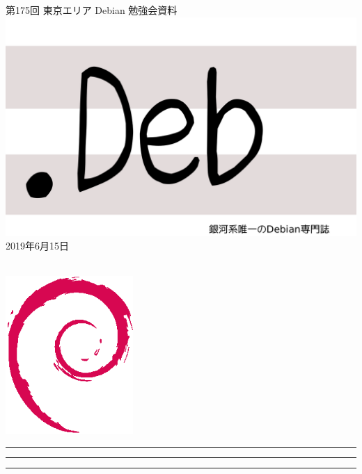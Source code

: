 \documentclass[mingoth,a4paper]{jsarticle}
\newcommand{\debmtgyear}{2019}
\newcommand{\debmtgmonth}{6}
\newcommand{\debmtgdate}{15}
\newcommand{\debmtgnumber}{175}
\begin{document}
\begin{titlepage}
\thispagestyle{empty}

\vspace*{-2cm}
第\debmtgnumber{}回 東京エリア Debian 勉強会資料\\
\hspace*{-2cm}
\includegraphics{image2012-natsu/dotdeb.pdf}\\
\hfill{}\debmtgyear{}年\debmtgmonth{}月\debmtgdate{}日

\\

\vspace*{-2cm}
\hfill{}\includegraphics[height=6cm]{image200502/openlogo-nd.eps}
\end{titlepage}

\newpage

\begin{minipage}[b]{0.2\hsize}
 \colorbox{titleback}{}
\end{minipage}
\begin{minipage}[b]{0.8\hsize}
\hrule
\vspace{2mm}
\hrule
\begin{multicols}{2}
\tableofcontents
\end{multicols}
\vspace{2mm}
\hrule
\end{minipage}
\end{document}
